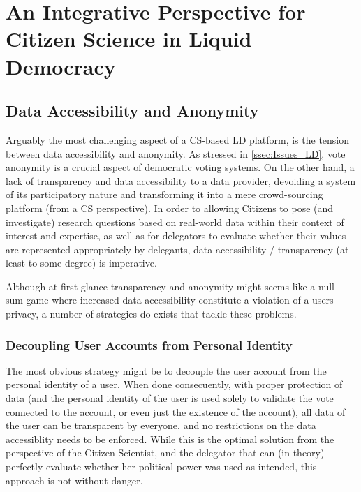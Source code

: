 \label{ssec:Issues_LD}
\section[An Integrative Perspective for CS in LD]{An Integrative Perspective for Citizen Science in Liquid Democracy}
\label{sec:Integration_CSLD}

\subsection{Data Accessibility and Anonymity}
\label{ssec:Integration_AccessibilityAnonymity}
Arguably the most challenging aspect of a CS-based LD platform, is the tension between data accessibility and anonymity. As stressed  in \ref{ssec:Issues_LD}, vote anonymity is a crucial aspect of democratic voting systems. On the other hand, a lack of transparency and data accessibility  to a data provider, devoiding a system of its participatory nature and transforming it into a mere crowd-sourcing platform (from a CS perspective). In order to allowing Citizens to pose (and investigate) research questions based on real-world data within their context of interest and expertise, as well as for delegators to evaluate whether their values are represented appropriately by delegants, data accessibility / transparency (at least to some degree) is imperative.

Although at first glance transparency and anonymity might seems like a null-sum-game where increased data accessibility constitute a violation of a users privacy, a number of strategies do exists that tackle these problems.

\subsubsection{Decoupling User Accounts from Personal Identity}

The most obvious strategy might be to decouple the user account from the personal identity of a user. When done consecuently, with proper protection of data (and the personal identity of the user is used solely to validate the vote connected to the account, or even just the existence of the account), all data of the user can be transparent by everyone, and no restrictions on the data accessiblity needs to be enforced. While this is the optimal solution from the perspective of the Citizen Scientist, and the delegator that can (in theory) perfectly evaluate whether her political power was used as intended, this approach is not without danger.

